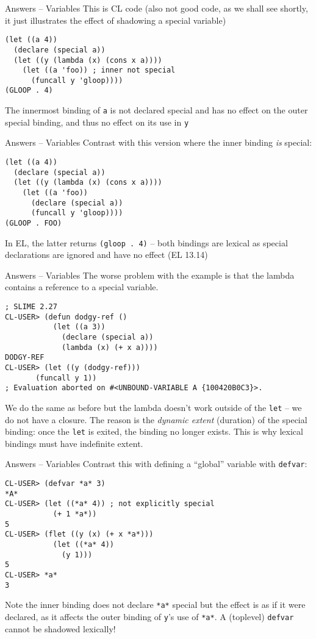 \documentclass[presentation]{beamer}
\begin{document}
\begin{frame}[fragile]{Answers -- Variables}
This is CL code (also not good code, as we shall see shortly, it just illustrates the effect of shadowing a special variable)
\begin{verbatim}
(let ((a 4))
  (declare (special a))
  (let ((y (lambda (x) (cons x a))))
    (let ((a 'foo)) ; inner not special
      (funcall y 'gloop))))
(GLOOP . 4)
\end{verbatim}
The innermost binding of \texttt{a} is not declared special and has no effect on the outer special binding, and thus no effect on its use in \texttt{y}
\end{frame}
\begin{frame}[fragile]{Answers -- Variables}
Contrast with this version where the inner binding \emph{is} special:
\begin{verbatim}
(let ((a 4))
  (declare (special a))
  (let ((y (lambda (x) (cons x a))))
    (let ((a 'foo))
      (declare (special a))
      (funcall y 'gloop))))
(GLOOP . FOO)
\end{verbatim}
In EL, the latter returns \texttt{(gloop . 4)} -- both bindings are lexical as special declarations are ignored and have no effect (EL 13.14)
\end{frame}
\begin{frame}[fragile]{Answers -- Variables}
The worse problem with the example is that the lambda contains a reference to a special variable.  
\begin{verbatim}
; SLIME 2.27
CL-USER> (defun dodgy-ref ()
           (let ((a 3))
             (declare (special a))
             (lambda (x) (+ x a))))
DODGY-REF
CL-USER> (let ((y (dodgy-ref)))
	   (funcall y 1))
; Evaluation aborted on #<UNBOUND-VARIABLE A {100420B0C3}>.
\end{verbatim}
We do the same as before but the lambda doesn't work outside of the \texttt{let} -- we do not have a closure.  The reason is the \emph{dynamic extent} (duration) of the special binding: once the \texttt{let} is exited, the binding no longer exists.  This is why lexical bindings must have indefinite extent.
\end{frame}
\begin{frame}[fragile]{Answers -- Variables}
Contrast this with defining a ``global'' variable with \texttt{defvar}:
\begin{verbatim}
CL-USER> (defvar *a* 3)
*A*
CL-USER> (let ((*a* 4)) ; not explicitly special
           (+ 1 *a*))
5
CL-USER> (flet ((y (x) (+ x *a*)))
           (let ((*a* 4))
             (y 1)))
5
CL-USER> *a*
3
\end{verbatim}
Note the inner binding does not declare \texttt{*a*} special but the effect is as if it were declared, as it affects the outer binding of \texttt{y}'s use of \texttt{*a*}.  A (toplevel) \texttt{defvar} cannot be shadowed lexically!
\end{frame}
\end{document}
